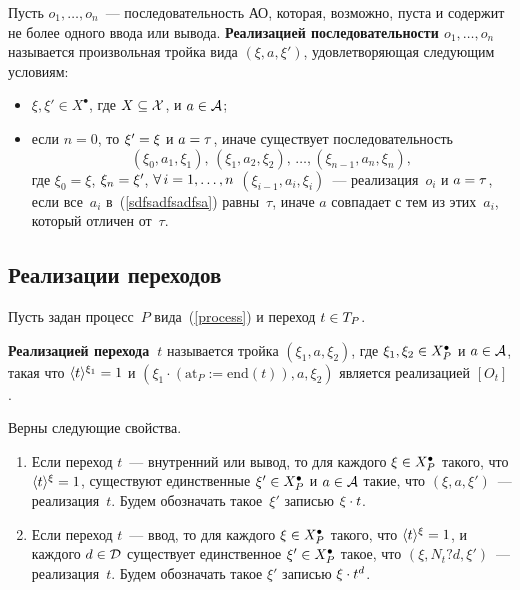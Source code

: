 \begin{multicols}{2}
Пусть $o_1,\ldots, o_n$~--- последовательность АО,
которая, возможно, пуста и содержит не более одного ввода или вывода.
{\bf Реализацией последова\-тель\-ности $o_1,\ldots, o_n$}
называется произвольная тройка вида $(\xi, a, \xi')$,
удовлетворяющая следующим условиям:
\begin{itemize}
\item $\xi,\xi' \in X^\bullet$, где $X\hm\subseteq {\cal X}$,
и $a\hm\in {\cal A}$;
\item если $n=0$, то $\xi'\hm=\xi$ и $a\hm=\tau$, иначе
существует последовательность
\begin{equation}
\label{sdfsadfsadfsa}
(\xi_0, a_1, \xi_1),\,
(\xi_1, a_2, \xi_2),\,\ldots ,
(\xi_{n-1}, a_n, \xi_n),
\end{equation}
где
$\xi_0=\xi$, $\xi_n\hm=\xi'$,
$\forall\,i\hm=1,\ldots, n$ $(\xi_{i-1}, a_i, \xi_i)$~---
реализация~$o_i$ и $a\hm=\tau$,
если все~$a_i$ в~(\ref{sdfsadfsadfsa})
равны~$\tau$, иначе $a$ совпадает с тем из этих~$a_i$, который отличен от~$\tau$.
\end{itemize}

\subsection{Реализации переходов}

Пусть задан процесс~$P$ вида~(\ref{process}) и переход $t\hm\in T_P$.

{\bf Реализацией перехода~$t$}
называется  тройка  $(\xi_1,a,\xi_2)$, где
$\xi_1, \xi_2\hm\in X_P^\bullet$ и $a\hm\in {\cal A}$, такая что
$\langle{t}\rangle^{\xi_1}\hm=1$ и $(\xi_1\cdot\left(\mathrm{at}_P:=\mathrm{end}\left(t\right)\right),a,\xi_2)$
является реализацией $[O_t]$.

Верны следующие свойства.
\begin{enumerate}[1.]
\item Если переход $t$~--- внутренний или вывод,
то для каждого $\xi\hm\in X_P^\bullet$ такого, что $\langle{t}\rangle^\xi\hm=1$,
существуют единственные $\xi'\hm\in X_P^\bullet$ и
$a\hm\in {\cal A}$ такие, что
 $(\xi, a, \xi')$~--- реализация~$t$.
Будем обозначать такое~$\xi'$  записью $\xi \cdot t$.

\item Если  переход $t$~--- ввод, то для каждого $\xi\hm\in X_P^\bullet$
такого, что $\langle{t}\rangle^\xi \hm= 1$, и каждого $d\hm\in {\cal D}$
существует единственное $\xi'\hm\in X_P^\bullet$ такое, что
 $(\xi, N_t?d, \xi')$~--- реализация~$t$.
Будем обозначать такое  $\xi'$ за\-писью $\xi \cdot t^d$.
\end{enumerate}


\end{multicols}
